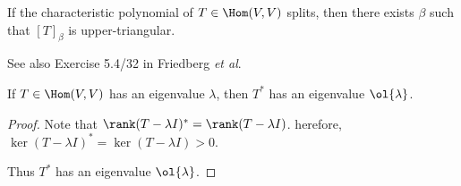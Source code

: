 \documentclass[11pt]{scrartcl}
\begin{document}
  \begin{theorem}[Schur]
    If the characteristic polynomial of $T \in \Hom(V,V)$ splits, then there exists $\beta$ such that $[T]_{\beta}$ is upper-triangular.
  \end{theorem}

  \begin{remark}
See also Exercise 5.4/32 in Friedberg \textit{et al}.
\end{remark}

\begin{lemma}
  If $T \in \Hom(V,V)$ has an eigenvalue $\lambda$, then $T^{*}$ has an eigenvalue $\ol{\lambda}$.
\end{lemma}

\begin{proof}
  \hfill

  Note that $\rank(T-\lambda I)^{*}=\rank(T-\lambda I)$. herefore, $\ker (T-\lambda I)^{*}= \ker (T-\lambda I) >0$.

  Thus $T^{*}$ has an eigenvalue $\ol{\lambda}$.
\end{proof}
\end{document}
